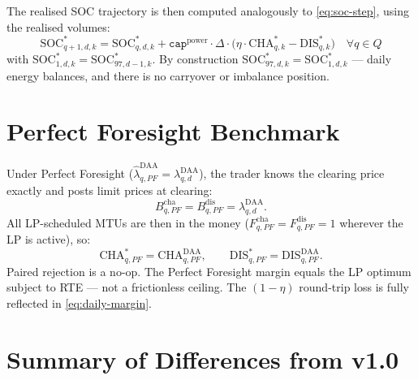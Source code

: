 \documentclass{article}
\numberwithin{equation}{subsection}
\begin{document}
The realised SOC trajectory is then computed analogously to \eqref{eq:soc-step}, using the realised volumes:
\begin{equation}
\mathrm{SOC}^{*}_{q+1,d,k} = \mathrm{SOC}^{*}_{q,d,k}
+ \texttt{cap}^{\text{power}} \cdot \Delta \cdot
\bigl(\eta \cdot \mathrm{CHA}^{*}_{q,k} - \mathrm{DIS}^{*}_{q,k}\bigr)
\quad \forall q \in Q
\end{equation}
with \(\mathrm{SOC}^{*}_{1,d,k} = \mathrm{SOC}^{*}_{97,d-1,k}\). By construction \(\mathrm{SOC}^{*}_{97,d,k} = \mathrm{SOC}^{*}_{1,d,k}\) --- daily energy balances, and there is no carryover or imbalance position.


\section{Perfect Foresight Benchmark}

Under Perfect Foresight (\(\hat{\lambda}^{\mathrm{DAA}}_{q,PF} = \lambda^{\mathrm{DAA}}_{q,d}\)), the trader knows the clearing price exactly and posts limit prices at clearing:
\begin{equation}
B^{\text{cha}}_{q,PF} = B^{\text{dis}}_{q,PF} = \lambda^{\text{DAA}}_{q,d}.
\end{equation}
All LP-scheduled MTUs are then in the money (\(F^{\text{cha}}_{q,PF} = F^{\text{dis}}_{q,PF} = 1\) wherever the LP is active), so:
\begin{equation}
\mathrm{CHA}^{*}_{q,PF} = \mathrm{CHA}^{\mathrm{DAA}}_{q,PF},
\qquad
\mathrm{DIS}^{*}_{q,PF} = \mathrm{DIS}^{\mathrm{DAA}}_{q,PF}.
\end{equation}
Paired rejection is a no-op. The Perfect Foresight margin equals the LP optimum subject to RTE --- not a frictionless ceiling. The \((1-\eta)\) round-trip loss is fully reflected in \eqref{eq:daily-margin}.


\section{Summary of Differences from v1.0}
\end{document}
